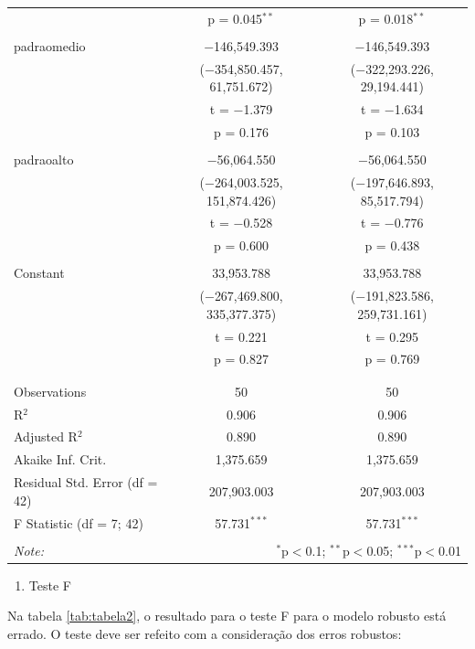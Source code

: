 \documentclass[a4paper]{article}
\providecommand{\tightlist}{%
  \setlength{\itemsep}{0pt}\setlength{\parskip}{0pt}}
\begin{document}
\begin{table}[!htbp]
\begin{tabular}{@{\extracolsep{5pt}}lcc}
  & p = 0.045$^{**}$ & p = 0.018$^{**}$ \\ 
  & & \\ 
 padraomedio & $-$146,549.393 & $-$146,549.393 \\ 
  & ($-$354,850.457, 61,751.672) & ($-$322,293.226, 29,194.441) \\ 
  & t = $-$1.379 & t = $-$1.634 \\ 
  & p = 0.176 & p = 0.103 \\ 
  & & \\ 
 padraoalto & $-$56,064.550 & $-$56,064.550 \\ 
  & ($-$264,003.525, 151,874.426) & ($-$197,646.893, 85,517.794) \\ 
  & t = $-$0.528 & t = $-$0.776 \\ 
  & p = 0.600 & p = 0.438 \\ 
  & & \\ 
 Constant & 33,953.788 & 33,953.788 \\ 
  & ($-$267,469.800, 335,377.375) & ($-$191,823.586, 259,731.161) \\ 
  & t = 0.221 & t = 0.295 \\ 
  & p = 0.827 & p = 0.769 \\ 
  & & \\ 
\hline \\[-1.8ex] 
Observations & 50 & 50 \\ 
R$^{2}$ & 0.906 & 0.906 \\ 
Adjusted R$^{2}$ & 0.890 & 0.890 \\ 
Akaike Inf. Crit. & 1,375.659 & 1,375.659 \\ 
Residual Std. Error (df = 42) & 207,903.003 & 207,903.003 \\ 
F Statistic (df = 7; 42) & 57.731$^{***}$ & 57.731$^{***}$ \\ 
\hline 
\hline \\[-1.8ex] 
\textit{Note:}  & \multicolumn{2}{r}{$^{*}$p$<$0.1; $^{**}$p$<$0.05; $^{***}$p$<$0.01} \\ 
\end{tabular} 
\end{table}

\begin{enumerate}
\def\labelenumi{\alph{enumi}.}
\setcounter{enumi}{1}
\tightlist
\item
  Teste F
\end{enumerate}

Na tabela \ref{tab:tabela2}, o resultado para o teste F para o modelo
robusto está errado. O teste deve ser refeito com a consideração dos
erros robustos:
\end{document}
